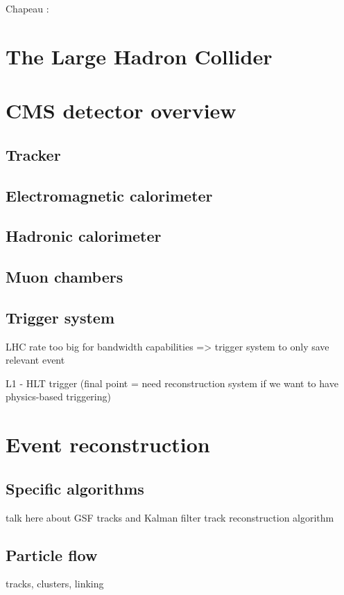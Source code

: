 Chapeau :

\section{The Large Hadron Collider}


\section{CMS detector overview}
\label{sec:detectors}
\subsection{Tracker}

\subsection{Electromagnetic calorimeter}

\subsection{Hadronic calorimeter}

\subsection{Muon chambers}

\subsection{Trigger system}

LHC rate too big for bandwidth capabilities => trigger system to only save relevant event

L1 - HLT trigger (final point = need reconstruction system if we want to have physics-based triggering)

\section{Event reconstruction}

\subsection{Specific algorithms}

talk here about GSF tracks and Kalman filter track reconstruction algorithm

\subsection{Particle flow}
\label{sec:pf}
tracks, clusters, linking

